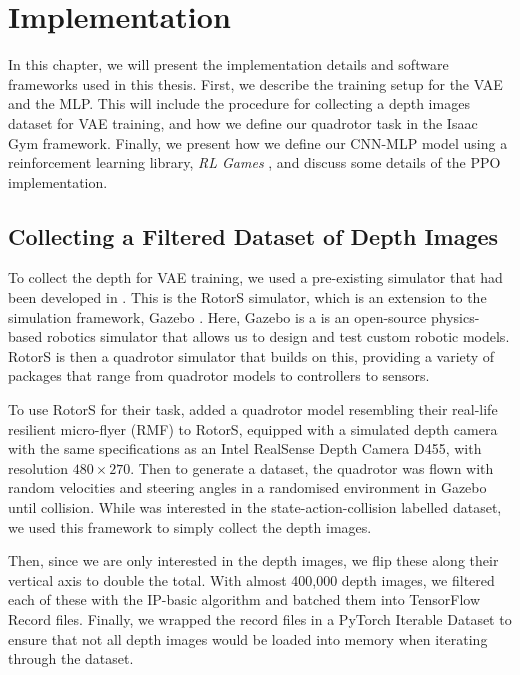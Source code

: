 \chapter{Implementation}
\label{chap:6_implementation}

In this chapter, we will present the implementation details and software frameworks used in this thesis.
First, we describe the training setup for the VAE and the MLP. This will include the procedure for collecting a depth images dataset for VAE training, and how we define our quadrotor task in the Isaac Gym framework. Finally, we present how we define our CNN-MLP model using a reinforcement learning library, \textit{RL Games} \cite{rl-games2022}, and discuss some details of the PPO implementation.

\section{Collecting a Filtered Dataset of Depth Images}
To collect the depth for VAE training, we used a pre-existing simulator that had been developed in \cite{deepCollisionPredictorOracle}. This is the RotorS \cite{RotorS_Furrer2016} simulator, which is an extension to the simulation framework, Gazebo \cite{Gazebo}. Here, Gazebo is a is an open-source physics-based robotics simulator that allows us to design and test custom robotic models. RotorS is then a quadrotor simulator that builds on this, providing a variety of packages that range from quadrotor models to controllers to sensors. 

To use RotorS for their task, \cite{deepCollisionPredictorOracle} added a quadrotor model resembling their real-life resilient micro-flyer (RMF) to RotorS, equipped with a simulated depth camera with the same specifications as an Intel RealSense Depth Camera D455, with resolution $480 \times 270$. Then to generate a dataset, the quadrotor was flown with random velocities and steering angles in a randomised environment in Gazebo until collision. While \cite{deepCollisionPredictorOracle} was interested in the state-action-collision labelled dataset, we used this framework to simply collect the depth images.

Then, since we are only interested in the depth images, we flip these along their vertical axis to double the total. With almost 400,000 depth images, we filtered each of these with the IP-basic algorithm \cite{filtering_depth_completion} and batched them into TensorFlow Record files. Finally, we wrapped the record files in a PyTorch Iterable Dataset to ensure that not all depth images would be loaded into memory when iterating through the dataset.




